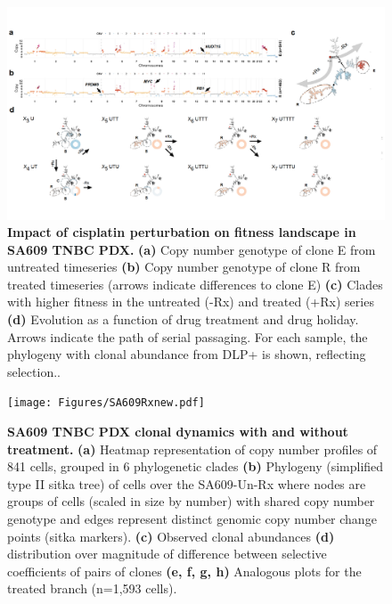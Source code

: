 \begin{figure}
\centering
\includegraphics[width=\textwidth]{Figures/drugholidayfitnesscost.pdf}
	
\caption[Impact of cisplatin perturbation on fitness landscape in  SA609 TNBC PDX.]
	{\small
	\textbf{Impact of cisplatin perturbation on fitness landscape in  SA609 TNBC PDX.}
	  \textbf{(a)} Copy number genotype of clone E from untreated timeseries \textbf{(b)} Copy number genotype of clone R from treated timeseries (arrows indicate differences to clone E) \textbf{(c)} Clades with higher fitness in the untreated (-Rx) and treated (+Rx) series \textbf{(d)} Evolution as a function of drug treatment and drug holiday. Arrows indicate the path of serial passaging. For each sample, the phylogeny with clonal abundance from DLP+ is shown, reflecting selection..
	}
	\label{fig:drugholidayfitnesscost}
\end{figure}



\begin{figure}
\centering
\texttt{[image: Figures/SA609Rxnew.pdf]}
	
\caption[SA609 TNBC PDX clonal dynamics with and without treatment.]
	{\small
	\textbf{SA609 TNBC PDX clonal dynamics with and without treatment.}
	    \textbf{(a)} Heatmap representation of copy number profiles of 841 cells, grouped in 6 phylogenetic clades 
	    \textbf{(b)} Phylogeny (simplified type II sitka tree) of cells over the SA609-Un-Rx where nodes are groups of cells (scaled in size by number) with shared copy number genotype and edges represent distinct genomic copy number change points (sitka markers). \textbf{(c)} Observed clonal abundances \textbf{(d)} distribution over magnitude of difference between selective coefficients of pairs of clones \textbf{(e, f, g, h)} Analogous plots for the treated branch (n=1,593 cells).
	}
	\label{fig:SA609Rxnew}
\end{figure}

